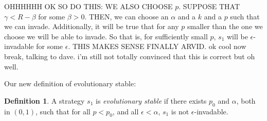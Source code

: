 \documentclass[11pt]{amsart}
\theoremstyle{definition}
\newtheorem{definition}{Definition}
\theoremstyle{remark}
\begin{document}
    OHHHHHH OK SO DO THIS: WE ALSO CHOOSE $p$. SUPPOSE THAT $\gamma < R - \beta$ for some $\beta > 0$. THEN, we can choose an $\alpha$ and a $k$ and a $p$ such that we can invade. Additionally, it will be true that for any $p$ smaller than the one we choose we will be able to invade. So that is, for sufficiently small $p$, $s_1$ will be $\epsilon$-invadable for some $\epsilon$. THIS MAKES SENSE FINALLY ARVID. ok cool now break, talking to dave. i'm still not totally convinced that this is correct but oh well.

    Our new definition of evolutionary stable:

    \begin{definition}
      A strategy $s_1$ is \textit{evolutionary stable} if there exists $p_0$ and $\alpha$, both in $(0,1)$, such that for all $p < p_0$, and all $\epsilon < \alpha$, $s_1$ is not $\epsilon$-invadable.
    \end{definition}
\end{document}

